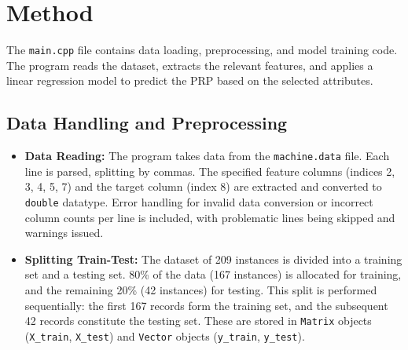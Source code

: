 \section{Method}
\label{sec:method}
The \texttt{main.cpp} file contains data loading, preprocessing, and model training code. The program reads the dataset, extracts the relevant features, and applies a linear regression model to predict the PRP based on the selected attributes. 

\subsection{Data Handling and Preprocessing}
\begin{itemize}
    \item \textbf{Data Reading:} The program takes data from the \texttt{machine.data} file. Each line is parsed, splitting by commas. The specified feature columns (indices 2, 3, 4, 5, 7) and the target column (index 8) are extracted and converted to \texttt{double} datatype. Error handling for invalid data conversion or incorrect column counts per line is included, with problematic lines being skipped and warnings issued.
    \item \textbf{Splitting Train-Test:} The dataset of 209 instances is divided into a training set and a testing set. 80\% of the data (167 instances) is allocated for training, and the remaining 20\% (42 instances) for testing. This split is performed sequentially: the first 167 records form the training set, and the subsequent 42 records constitute the testing set. These are stored in \texttt{Matrix} objects (\texttt{X\_train}, \texttt{X\_test}) and \texttt{Vector} objects (\texttt{y\_train}, \texttt{y\_test}).
\end{itemize}

